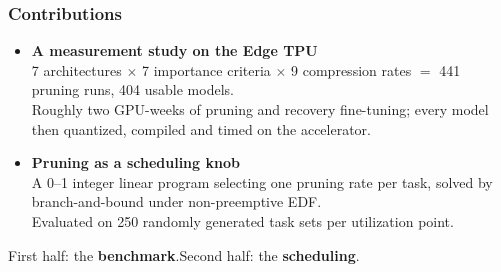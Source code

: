 \begin{frame}
\frametitle{Contributions}

\begin{itemize}\setlength{\itemsep}{11pt}
  \item[{\color{blue!80!black}$\bullet$}]
    \textbf{A measurement study on the Edge TPU}\\[2pt]
    {\small 7 architectures $\times$ 7 importance criteria $\times$ 9 compression
     rates $=$ 441 pruning runs, 404 usable models.\\
     Roughly two GPU-weeks of pruning and recovery fine-tuning; every model
     then quantized, compiled and timed on the accelerator.}
  \item[{\color{blue!80!black}$\bullet$}]
    \textbf{Pruning as a scheduling knob}\\[2pt]
    {\small A 0--1 integer linear program selecting one pruning rate per task,
     solved by branch-and-bound under non-preemptive EDF.\\
     Evaluated on 250 randomly generated task sets per utilization point.}
\end{itemize}

\vspace{0.4cm}
\begin{center}
{\small First half: the \textbf{benchmark}.\qquad Second half: the \textbf{scheduling}.}
\end{center}

\end{frame}

